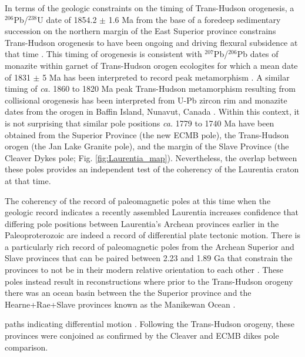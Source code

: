 \documentclass[draft]{agujournal2019}
\begin{document}
In terms of the geologic constraints on the timing of Trans-Hudson orogenesis, a $^{206}$Pb/$^{238}$U date of 1854.2 $\pm$ 1.6 Ma from the base of a foredeep sedimentary succession on the northern margin of the East Superior province constrains Trans-Hudson orogenesis to have been ongoing and driving flexural subsidence at that time \cite{Hodgskiss2019a}. This timing of orogenesis is consistent with $^{207}$Pb/$^{206}$Pb dates of monazite within garnet of Trans-Hudson orogen ecologites for which a mean date of 1831 $\pm$ 5 Ma has been interpreted to record peak metamorphism \cite{Weller2017a}. A similar timing of \textit{ca.} 1860 to 1820 Ma peak Trans-Hudson metamorphism resulting from collisional orogenesis has been interpreted from U-Pb zircon rim and monazite dates from the orogen in Baffin Island, Nunavut, Canada \cite{Skipton2016a}. Within this context, it is not surprising that similar pole positions \textit{ca.} 1779 to 1740 Ma have been obtained from the Superior Province (the new ECMB pole), the Trans-Hudson orogen (the Jan Lake Granite pole), and the margin of the Slave Province (the Cleaver Dykes pole; Fig. \ref{fig:Laurentia_map}). Nevertheless, the overlap between these poles provides an independent test of the coherency of the Laurentia craton at that time. 

The coherency of the record of paleomagnetic poles at this time when the geologic record indicates a recently assembled Laurentia increases confidence that differing pole positions between Laurentia's Archean provinces earlier in the Paleoproterozoic are indeed a record of differential plate tectonic motion. There is a particularly rich record of paleomagnetic poles from the Archean Superior and Slave provinces that can be paired between 2.23 and 1.89 Ga that constrain the provinces to not be in their modern relative orientation to each other \cite{Mitchell2014a, Buchan2016a, Swanson-Hysell2021a}. These poles instead result in reconstructions where prior to the Trans-Hudson orogeny there was an ocean basin between the the Superior province and the Hearne+Rae+Slave provinces known as the Manikewan Ocean \citep{Stauffer1984a}.


paths indicating differential motion \cite{Mitchell2014a, Buchan2016a, Swanson-Hysell2021a}. Following the Trans-Hudson orogeny, these provinces were conjoined as confirmed by the Cleaver and ECMB dikes pole comparison.
\end{document}
